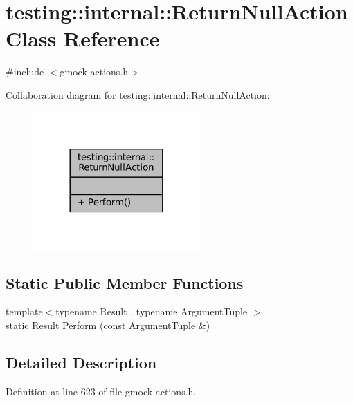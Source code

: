 \hypertarget{classtesting_1_1internal_1_1ReturnNullAction}{}\section{testing\+:\+:internal\+:\+:Return\+Null\+Action Class Reference}
\label{classtesting_1_1internal_1_1ReturnNullAction}


{\ttfamily \#include $<$gmock-\/actions.\+h$>$}



Collaboration diagram for testing\+:\+:internal\+:\+:Return\+Null\+Action\+:
\nopagebreak
\begin{figure}[H]
\begin{center}
\leavevmode
\includegraphics[width=180pt]{classtesting_1_1internal_1_1ReturnNullAction__coll__graph}
\end{center}
\end{figure}
\subsection*{Static Public Member Functions}
\begin{DoxyCompactItemize}
\item 
{\footnotesize template$<$typename Result , typename Argument\+Tuple $>$ }\\static Result \hyperlink{classtesting_1_1internal_1_1ReturnNullAction_a6ce1fba236686df93070320b399e4f32}{Perform} (const Argument\+Tuple \&)
\end{DoxyCompactItemize}


\subsection{Detailed Description}


Definition at line 623 of file gmock-\/actions.\+h.



